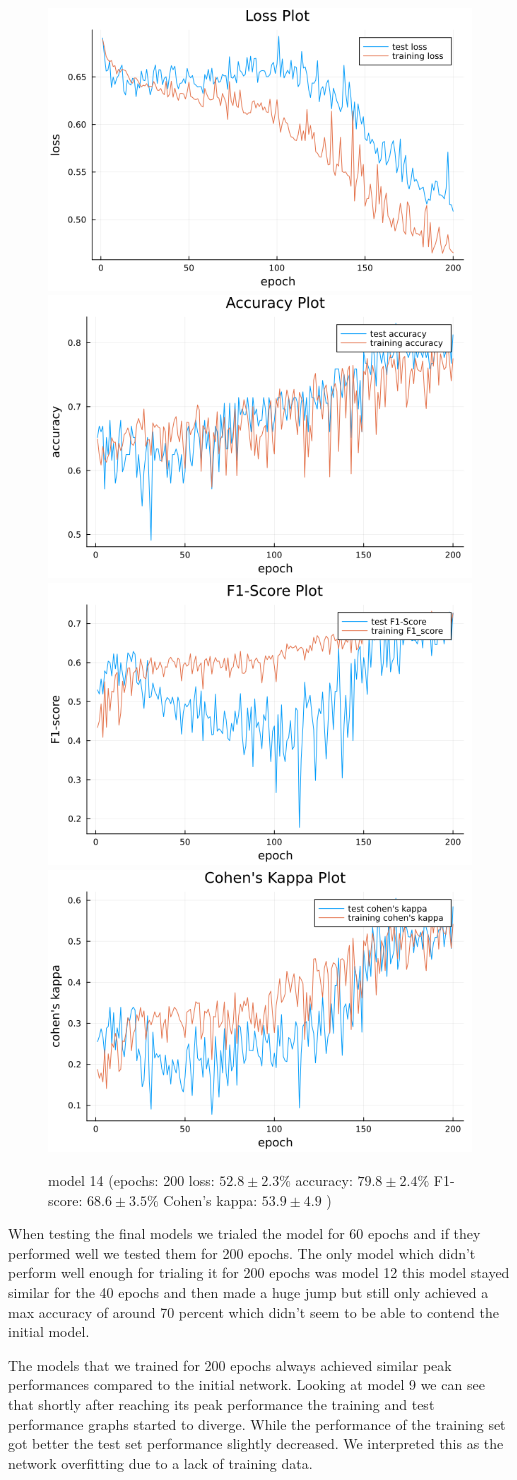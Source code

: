 \documentclass[
a4paper, 
12pt,
grayscalebody, %
abstract=on,
twoside, BCOR10mm, 12pt, DIV13,headinclude, footexclude, final, abstracton, openright
]{ibireprt}
\numberwithin{equation}{chapter}
\numberwithin{table}{chapter}
\numberwithin{figure}{chapter}
\numberwithin{algorithm}{chapter}
\numberwithin{example}{chapter}
\numberwithin{example}{chapter}
\begin{document}
\begin{figure}
	\includegraphics[width=0.4\linewidth]{loss_png_14_4.png}\hfill
	\includegraphics[width=0.4\linewidth]{accuracy_png_14_4.png}
	\\[\smallskipamount]
	\includegraphics[width=0.4\linewidth]{f1_score_png_14_4.png}\hfill
	\includegraphics[width=0.4\linewidth]{cohens_kappa_png_14_4.png}
	\caption{model 14 (epochs: 200 loss: $52.8\pm2.3\% $ accuracy: $79.8\pm2.4\%$ F1-score: $68.6\pm3.5\%$  Cohen's kappa: $53.9\pm4.9$ )}
\end{figure}
	\clearpage 
	
When testing the final models we trialed the model for 60 epochs and if they performed well we tested them for 200 epochs. The only model which didn't perform well enough for trialing it for 200 epochs was model 12 this model stayed similar for the 40 epochs and then made a huge jump but still only achieved a max accuracy of around 70 percent which didn't seem to be able to contend the initial model. 

The models that we trained for 200 epochs always achieved similar peak performances compared to the initial network. Looking at model 9 we can see that shortly after reaching its peak performance the training and test performance graphs started to diverge. While the performance of the training set got better the test set performance slightly decreased. We interpreted this as the network overfitting due to a lack of training data.
\end{document}
